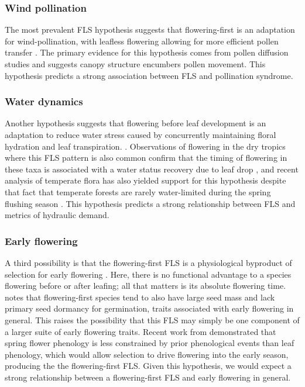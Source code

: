 \documentclass{article}
\begin{document}
\subsubsection*{ Wind pollination}
\noindent The most prevalent FLS hypothesis suggests that flowering-first is an adaptation for wind-pollination, with leafless flowering allowing for more efficient pollen transfer \citep{Whitehead1969, Spurr1980,Friedman2009}. The primary evidence for this hypothesis comes from pollen diffusion studies \citep[e.g., particle movement through closed and open canopies,][]{Niklas1985,Nathan2005, Milleron2012} and suggests canopy structure encumbers pollen movement. This hypothesis predicts a strong association between FLS and pollination syndrome.
\subsubsection*{Water dynamics}
\noindent Another hypothesis suggests that flowering before leaf development is an adaptation to reduce water stress caused by concurrently maintaining floral hydration and leaf transpiration. \citep{Franklin2016}. Observations of flowering in the dry tropics where this FLS pattern is also common confirm that the timing of flowering in these taxa is associated with a water status recovery due to leaf drop \citep{Borchert1983,Reich1984}, and recent analysis of temperate flora has also yielded support for this hypothesis despite that fact that temperate forests are rarely water-limited during the spring flushing season \citep{Gougherty2018}. This hypothesis predicts a strong relationship between FLS and metrics of hydraulic demand.
 
\subsubsection*{Early flowering}
\noindent A third possibility is that the flowering-first FLS is a physiological byproduct of selection for early flowering \citep{Primack1987}. Here, there is no functional advantage to a species flowering before or after leafing; all that matters is its absolute flowering time. \citet{Primack1987} notes that flowering-first species tend to also have large seed mass and lack primary seed dormancy for germination, traits associated with early flowering in general. This raises the possibility that this FLS may simply be one component of a larger suite of early flowering traits. Recent work from \citet{Savage2019} demonstrated that spring flower phenology is less constrained by prior phenological events than leaf phenology, which would allow selection to drive flowering into the early season, producing the the flowering-first FLS. Given this hypothesis, we would expect a strong relationship between a flowering-first FLS and early flowering in general.
\end{document}
